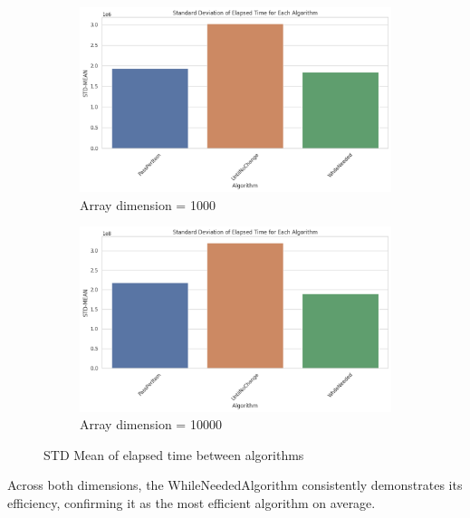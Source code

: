 \documentclass{article}
\begin{document}
\begin{figure}[H]
    \centering
    \begin{subfigure}[b]{0.48\textwidth}
        \centering
        \includegraphics[width=\textwidth]{./data/std_algo_1000.png}
        \caption{Array dimension = 1000}
    \end{subfigure}
    \hfill
    \begin{subfigure}[b]{0.48\textwidth}
        \centering
        \includegraphics[width=\textwidth]{./data/std_algo_10000.png}
        \caption{Array dimension = 10000}
    \end{subfigure}
    \caption{STD Mean of elapsed time between algorithms}
\end{figure}

Across both dimensions, the WhileNeededAlgorithm consistently demonstrates its efficiency, confirming it as the most efficient algorithm on average.
\end{document}
